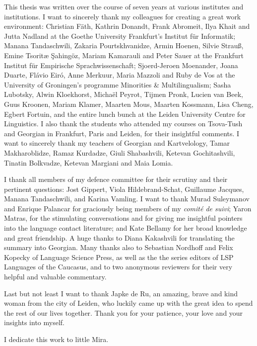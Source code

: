This thesis was written over the course of seven years at various institutes and institutions. I want to sincerely thank my colleagues for creating a great work environment: Christian Fäth, Kathrin Donandt, Frank Abromeit, Ilya Khait and Jutta Nadland at the Goethe University Frankfurt's Institut für Informatik; Manana Tandaschwili, Zakaria Pourtskhvanidze, Armin Hoenen, Silvie Strauß, Emine Tsoritæ Şahingöz, Mariam Kamarauli and Peter Sauer at the Frankfurt Institut für Empirische Sprachwissenschaft; Sjoerd-Jeroen Moenander, Joana Duarte, Flávio Eiró, Anne Merkuur, Maria Mazzoli and Ruby de Vos at the University of Groningen's programme Minorities \& Multilingualism; Sasha Lubotsky, Alwin Kloekhorst, Michaël Peyrot, Tijmen Pronk, Lucien van Beek, Guus Kroonen, Mariam Klamer, Maarten Mous, Maarten Kossmann, Lisa Cheng, Egbert Fortuin, and the entire lunch bunch at the Leiden University Centre for Linguistics. I also thank the students who attended my courses on Tsova-Tush and Georgian in Frankfurt, Paris and Leiden, for their insightful comments. I want to sincerely thank my teachers of Georgian and Kartvelology, Tamar Makharoblidze, Ramaz Kurdadze, Giuli Shabashvili, Ketevan Gochitashvili, Tinatin Bolkvadze, Ketevan Margiani and Maia Lomia.

I thank all members of my defence committee for their scrutiny and their pertinent questions: Jost Gippert, Viola Hildebrand-Schat, Guillaume Jacques, Manana Tandaschwili, and Karina Vamling. I want to thank Murad Suleymanov and Enrique Palancar for graciously being members of my \textit{comité de suivi}; Yaron Matras, for the stimulating conversations and for giving me insightful pointers into the language contact literature; and Kate Bellamy for her broad knowledge and great friendship. A huge thanks to Diana Kakashvili for translating the summary into Georgian. Many thanks also to Sebastian Nordhoff and Felix Kopecky of Language Science Press, as well as the the series editors of LSP Languages of the Caucasus, and to two anonymous reviewers for their very helpful and valuable commentary.

Last but not least I want to thank Japke de Ru, an amazing, brave and kind woman from the city of Leiden, who luckily came up with the great idea to spend the rest of our lives together. Thank you for your patience, your love and your insights into myself. 


I dedicate this work to little Mira.
